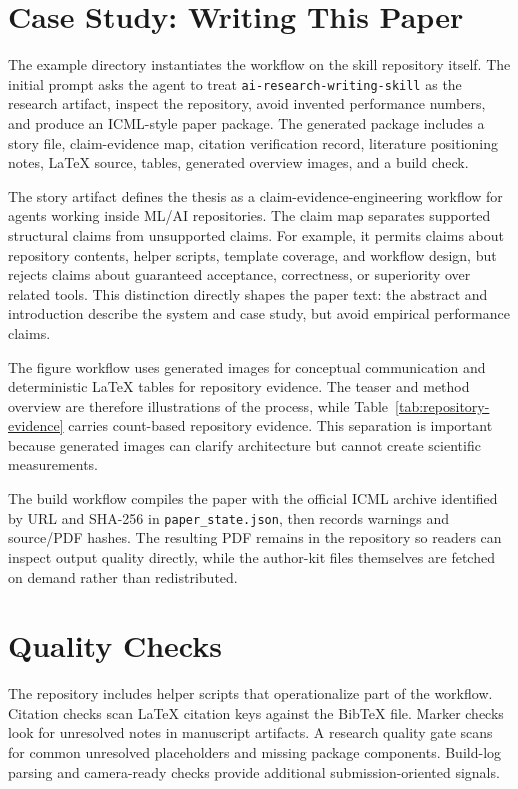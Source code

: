\documentclass{article}
\begin{document}
\section{Case Study: Writing This Paper}

The example directory instantiates the workflow on the skill repository itself. The initial prompt asks the agent to treat \texttt{ai-research-writing-skill} as the research artifact, inspect the repository, avoid invented performance numbers, and produce an ICML-style paper package. The generated package includes a story file, claim-evidence map, citation verification record, literature positioning notes, LaTeX source, tables, generated overview images, and a build check.

The story artifact defines the thesis as a claim-evidence-engineering workflow for agents working inside ML/AI repositories. The claim map separates supported structural claims from unsupported claims. For example, it permits claims about repository contents, helper scripts, template coverage, and workflow design, but rejects claims about guaranteed acceptance, correctness, or superiority over related tools. This distinction directly shapes the paper text: the abstract and introduction describe the system and case study, but avoid empirical performance claims.

The figure workflow uses generated images for conceptual communication and deterministic LaTeX tables for repository evidence. The teaser and method overview are therefore illustrations of the process, while Table~\ref{tab:repository-evidence} carries count-based repository evidence. This separation is important because generated images can clarify architecture but cannot create scientific measurements.

The build workflow compiles the paper with the official ICML archive identified by URL and SHA-256 in \texttt{paper\_state.json}, then records warnings and source/PDF hashes. The resulting PDF remains in the repository so readers can inspect output quality directly, while the author-kit files themselves are fetched on demand rather than redistributed.

\section{Quality Checks}

The repository includes helper scripts that operationalize part of the workflow. Citation checks scan LaTeX citation keys against the BibTeX file. Marker checks look for unresolved notes in manuscript artifacts. A research quality gate scans for common unresolved placeholders and missing package components. Build-log parsing and camera-ready checks provide additional submission-oriented signals.
\end{document}
